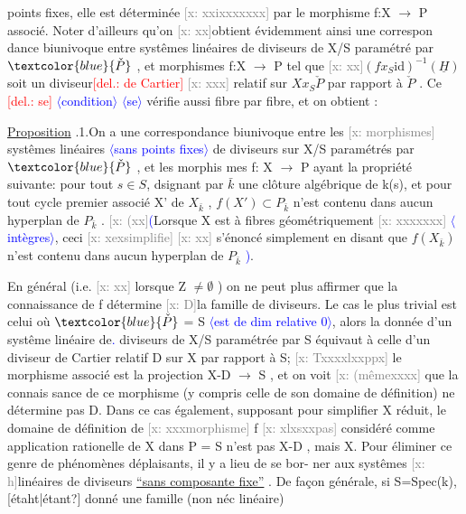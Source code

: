 \documentclass[11pt]{article}
\newcommand{\scanpage}[1]{\par\bigskip\noindent{\small\sffamily[scan #1]}\par}
\newcommand{\mspage}[1]{{\small\sffamily[p.\,#1]}}
\newcommand{\hand}[1]{\textcolor{blue}{#1}}
\let\over\relax
\newcommand{\over}[2]{\textcolor{gray}{#1}\textcolor{blue}{\ensuremath{^{\!\nearrow}}#2}}
\newcommand{\inserted}[2][]{\textcolor{blue}{$\langle$#2$\rangle$}}
\newcommand{\deleted}[1]{\textcolor{red}{[\textsf{del.:} #1]}}
\newcommand{\xout}[1]{\textcolor{gray}{[\textsf{x:} #1]}}
\newcommand{\uline}[1]{\underline{#1}}
\newcommand{\unsure}[1]{[#1?]}
\begin{document}
\clearpage
\scanpage{25/116}
\mspage{19}

points fixes, elle est déterminée \xout{xxixxxxxxx} par le morphisme f:X $\longrightarrow$ P
associé. Noter d'ailleurs qu'on \xout{xx}obtient évidemment ainsi une correspon
dance biunivoque entre systêmes linéaires de diviseurs de X/S paramétré
par $\hand{\check{P}}$ , et morphismes f:X $\longrightarrow$ P tel que \xout{xx}$(fx_S\mathrm{id})^{-1}(\underline{H})$ soit un
diviseur\deleted{ de Cartier} \xout{xxx} relatif sur $Xx_S\check{P}$ par rapport à $\check{P}$ . Ce\over{\unsure{ci}}{tte} \deleted{se} \inserted{condition}
\inserted{se} vérifie aussi fibre par fibre, et on obtient :

\uline{Proposition} \over{\unsure{1}}{3}.1.On a une correspondance biunivoque entre les \xout{morphismes}
systêmes linéaires \inserted{sans points fixes} de diviseurs sur X/S paramétrés par $\hand{\check{P}}$ , et les morphis
mes f: X $\longrightarrow$ P ayant la propriété suivante: pour tout $s\in S$, d\over{e}{é}signant
par $\bar{k}$ une clôture algébrique de k(s), et pour tout cycle premier associé
X' de $X_{\bar{k}}$ , $f(X')\subset P_{\bar{k}}$ n'est contenu dans aucun hyperplan de $P_{\bar{k}}$ .
\xout{(xx}\hand{(}Lorsque X est à fibres géométriquement \xout{xxxxxxx} \inserted[typed]{intègres}, ceci \xout{xexsimplifie}
\xout{xx} s'énoncé simplement en disant que $f(X_{\bar{k}})$ n'est contenu dans aucun
hyperplan de $P_{\bar{k}}$ \hand{)}.

En général (i.e. \xout{xx} lorsque Z $\neq \emptyset$ ) on ne peut plus affirmer que
la connaissance de f détermine \xout{D}la famille de diviseurs. Le cas le plus
trivial est celui où $\hand{\check{P}}$ = S \inserted{est de dim relative 0}, alors la donnée d'un systême linéaire de\hand{.}
diviseurs de X/S paramétrée par S équivaut à celle d'un diviseur de
Cartier relatif D sur X par rapport à S; \xout{Txxxxlxxppx} le morphisme
associé est la projection X-D $\longrightarrow$ S , et on voit \xout{(mêmexxxx} que la connais
sance de ce morphisme (y compris celle de son domaine de définition)
ne détermine pas D. Dans ce cas également, supposant pour simplifier X
réduit, le domaine de définition de \xout{xxxmorphisme} f \xout{xlxsxxpas} considéré
comme application rationelle de X dans P = S n'est pas X-D , mais X.
Pour éliminer ce genre de phénomènes déplaisants, il y a lieu de se bor-%
ner aux systêmes \xout{h}linéaires de diviseurs \uline{``sans composante fixe''} . De
façon générale, si S=Spec(k), \unsure{étaht|étant} donné une famille (non néc linéaire)
\end{document}
